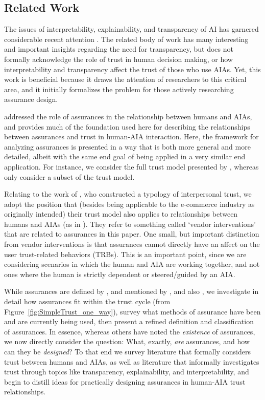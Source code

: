 \subsection{Related Work}\label{sec:rel_work}
    The issues of interpretability, explainability, and transparency of AI has garnered considerable recent attention \cite{Doshi-Velez2017-xy, Weller2017-zx, Lipton2016-ug, Gunning2017-ih}. The related body of work has many interesting and important insights regarding the need for transparency, but does not formally acknowledge the role of trust in human decision making, or how interpretability and transparency affect the trust of those who use AIAs. Yet, this work is beneficial because it draws the attention of researchers to this critical area, and it initially formalizes the problem for those actively researching assurance design.

    \citet{Lillard2016-yg} addressed the role of assurances in the relationship between humans and AIAs, and provides much of the foundation used here for describing the relationships between assurances and trust in human-AIA interaction. Here, the framework for analyzing assurances is presented in a way that is both more general and more detailed, albeit with the same end goal of being applied in a very similar end application. For instance, we consider the full trust model presented by \citet{McKnight2001-fa}, whereas \citeauthor{Lillard2016-yg} only consider a subset of the trust model.

    Relating to the work of \citet{McKnight2001-fa}, who constructed a typology of interpersonal trust, we adopt the position that (besides being applicable to the e-commerce industry as originally intended) their trust model also applies to relationships between humans and AIAs (as in \cite{Lillard2016-yg}). They refer to something called `vendor interventions' that are related to assurances in this paper. One small, but important distinction from vendor interventions is that assurances cannot directly have an affect on the user trust-related behaviors (TRBs). This is an important point, since we are considering scenarios in which the human and AIA are working together, and not ones where the human is strictly dependent or steered/guided by an AIA. 
    
    While assurances are defined by \citeauthor{Lillard2016-yg}, and mentioned by \citeauthor{McKnight2001-fa}, and also \citeauthor{Corritore2003-gx}, we investigate in detail how assurances fit within the trust cycle (from Figure~\ref{fig:SimpleTrust_one_way}), survey what methods of assurance have been and are currently being used, then present a refined definition and classification of assurances. In essence, whereas others have noted the \textit{existence} of assurances, we now directly consider the question: What, exactly, \textit{are} assurances, and how can they be \textit{designed}? To that end we survey literature that formally considers trust between humans and AIAs, as well as literature that informally investigates trust through topics like transparency, explainability, and interpretability, and begin to distill ideas for practically designing assurances in human-AIA trust relationships. 





